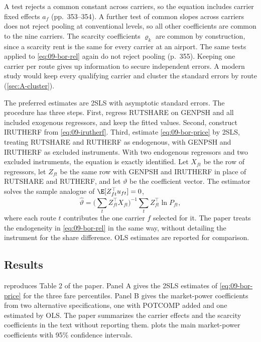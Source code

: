 A test rejects a common constant across carriers, so the equation
includes carrier fixed effects $a_f$ (pp.~353--354). A further test of common slopes across carriers does not
reject pooling at conventional levels, so all other coefficients are common to the nine carriers. The
scarcity coefficients $\varrho_k$ are common by construction, since a scarcity rent is the same for every
carrier at an airport. The same tests applied to \cref{eq:09-bor-rel} again do not reject pooling (p.~355).
Keeping one carrier per route gives up information to secure independent errors. A modern study would keep
every qualifying carrier and cluster the standard errors by route (\cref{sec:A-cluster}).

 The preferred estimates are 2SLS with asymptotic standard errors. The procedure has
three steps. First, regress RUTSHARE on GENPSH and all included exogenous regressors, and keep the fitted
values. Second, construct IRUTHERF from \cref{eq:09-irutherf}. Third, estimate \cref{eq:09-bor-price} by 2SLS,
treating RUTSHARE and RUTHERF as endogenous, with GENPSH and IRUTHERF as excluded instruments. With two
endogenous regressors and two excluded instruments, the equation is exactly identified. Let $X_{ft}$ be the row
of regressors, let $Z_{ft}$ be the same row with GENPSH and IRUTHERF in place of RUTSHARE and RUTHERF, and let
$\vartheta$ be the coefficient vector. The estimator solves the sample analogue of
$\E[Z_{ft}^\top u_{ft}] = 0$,
\begin{equation*}
\hat\vartheta = \Big(\sum_{t} Z_{ft}^\top X_{ft}\Big)^{-1} \sum_{t} Z_{ft}^\top \ln P_{ft} ,
\end{equation*}
where each route $t$ contributes the one carrier $f$ selected for it. The paper treats the endogeneity in
\cref{eq:09-bor-rel} in the same way, without detailing the instrument for the share difference. OLS estimates
are reported for comparison.

\subsection{Results}\label{sec:09-bor-results}

  reproduces Table 2 of the paper. Panel A gives the 2SLS
estimates of \cref{eq:09-bor-price} for the three fare percentiles. Panel B gives the market-power coefficients
from two alternative specifications, one with POTCOMP added and one estimated by OLS. The paper summarizes the
carrier effects and the scarcity coefficients in the text without reporting them.  plots
the main market-power coefficients with 95\% confidence intervals.

